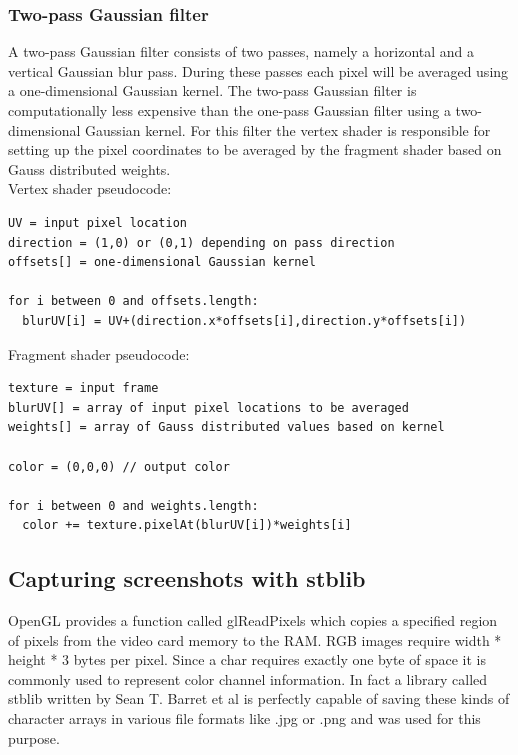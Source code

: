 \documentclass[11pt,a4paper,twoside,openright]{report}
\begin{document}
\subsubsection{Two-pass Gaussian filter}
A two-pass Gaussian filter consists of two passes, namely a horizontal and a vertical Gaussian blur pass. During these passes each pixel will be averaged using a one-dimensional Gaussian kernel. The two-pass Gaussian filter is computationally less expensive than the one-pass Gaussian filter using a two-dimensional Gaussian kernel. For this filter the vertex shader is responsible for setting up the pixel coordinates to be averaged by the fragment shader based on Gauss distributed weights.
\\
Vertex shader pseudocode:
\begin{lstlisting}[caption=Two-pass Gaussian filter vertex shader]
UV = input pixel location
direction = (1,0) or (0,1) depending on pass direction
offsets[] = one-dimensional Gaussian kernel

for i between 0 and offsets.length:
  blurUV[i] = UV+(direction.x*offsets[i],direction.y*offsets[i])
\end{lstlisting}
Fragment shader pseudocode:
\begin{lstlisting}[caption=Two-pass Gaussian filter fragment shader]
texture = input frame
blurUV[] = array of input pixel locations to be averaged
weights[] = array of Gauss distributed values based on kernel

color = (0,0,0) // output color

for i between 0 and weights.length:
  color += texture.pixelAt(blurUV[i])*weights[i]
\end{lstlisting}

\subsection{Capturing screenshots with stblib}
OpenGL provides a function called glReadPixels which copies a specified region of pixels from the video card memory to the RAM. RGB images require width * height * 3 bytes per pixel. Since a char requires exactly one byte of space it is commonly used to represent color channel information. In fact a library called stblib written by Sean T. Barret et al is perfectly capable of saving these kinds of character arrays in various file formats like .jpg or .png and was used for this purpose.
\end{document}
